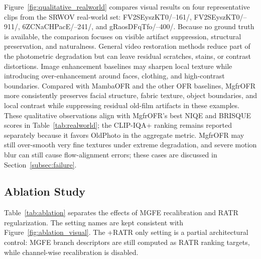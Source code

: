 Figure~\ref{fig:qualitative_realworld} compares visual results on four representative clips from the SRWOV real-world set: FV2SEyszKT0/--161/, FV2SEyszKT0/--911/, 6ZCNaCHPacE/--241/, and gRaosDFqTfo/--400/. Because no ground truth is available, the comparison focuses on visible artifact suppression, structural preservation, and naturalness. General video restoration methods reduce part of the photometric degradation but can leave residual scratches, stains, or contrast distortions. Image enhancement baselines may sharpen local texture while introducing over-enhancement around faces, clothing, and high-contrast boundaries. Compared with MambaOFR and the other OFR baselines, MgfrOFR more consistently preserves facial structure, fabric texture, object boundaries, and local contrast while suppressing residual old-film artifacts in these examples. These qualitative observations align with MgfrOFR's best NIQE and BRISQUE scores in Table~\ref{tab:realworld}; the CLIP-IQA+ ranking remains reported separately because it favors OldPhoto in the aggregate metric. MgfrOFR may still over-smooth very fine textures under extreme degradation, and severe motion blur can still cause flow-alignment errors; these cases are discussed in Section~\ref{subsec:failure}.



\FloatBarrier

\subsection{Ablation Study}
\label{subsec:ablation}

Table~\ref{tab:ablation} separates the effects of MGFE recalibration and RATR regularization. The setting names are kept consistent with Figure~\ref{fig:ablation_visual}. The +RATR only setting is a partial architectural control: MGFE branch descriptors are still computed as RATR ranking targets, while channel-wise recalibration is disabled.

